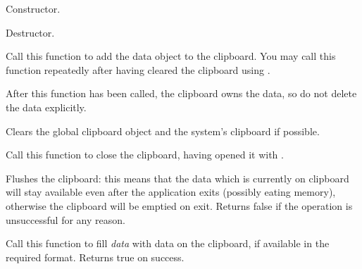 
Constructor.

\label{wxclipboarddtor}


Destructor.

\label{wxclipboardadddata}


Call this function to add the data object to the clipboard. You may call
this function repeatedly after having cleared the clipboard using .

After this function has been called, the clipboard owns the data, so do not delete
the data explicitly.



\label{wxclipboardclear}


Clears the global clipboard object and the system's clipboard if possible.

\label{wxclipboardclose}


Call this function to close the clipboard, having opened it with .

\label{wxclipboardflush}


Flushes the clipboard: this means that the data which is currently on
clipboard will stay available even after the application exits (possibly
eating memory), otherwise the clipboard will be emptied on exit.
Returns false if the operation is unsuccessful for any reason.

\label{wxclipboardgetdata}


Call this function to fill {\it data} with data on the clipboard, if available in the required
format. Returns true on success.

\label{wxclipboardisopened}

